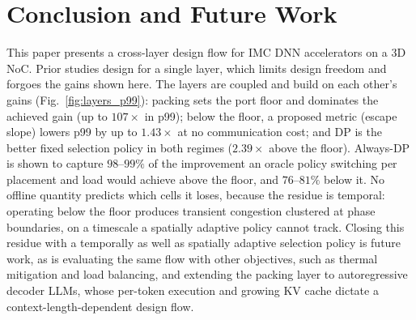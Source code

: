 \documentclass[conference]{IEEEtran}
\begin{document}
\section{Conclusion and Future Work}
This paper presents a cross-layer design flow for IMC DNN accelerators on a 3D NoC. Prior studies design for a single layer, which limits design freedom and forgoes the gains shown here. The layers are coupled and build on each other's gains (Fig.~\ref{fig:layers_p99}): packing sets the port floor and dominates the achieved gain (up to $107\times$ in p99); below the floor, a proposed metric (escape slope) lowers p99 by up to $1.43\times$ at no communication cost; and DP is the better fixed selection policy in both regimes ($2.39\times$ above the floor). Always-DP is shown to capture $98$–$99\%$ of the improvement an oracle policy switching per placement and load would achieve above the floor, and $76$–$81\%$ below it. No offline quantity predicts which cells it loses, because the residue is temporal: operating below the floor produces transient congestion clustered at phase boundaries, on a timescale a spatially adaptive policy cannot track. Closing this residue with a temporally as well as spatially adaptive selection policy is future work, as is evaluating the same flow with other objectives, such as thermal mitigation and load balancing, and extending the packing layer to autoregressive decoder LLMs, whose
per-token execution and growing KV cache dictate a context-length-dependent design flow.
\newpage


\end{document}
